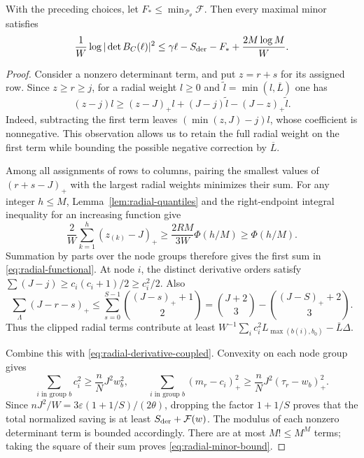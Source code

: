 \begin{proposition}\label{prop:radial-size}
With the preceding choices, let $F_*\leq\min_{\mathcal P_\theta}\mathcal F$.
Then every maximal minor satisfies
\begin{equation}\label{eq:radial-minor-bound}
 \frac1W\log|\det B_C(\ell)|^2
 \leq\gamma\ell-S_{\rm der}-F_*+\frac{2M\log M}{W}.
\end{equation}
\end{proposition}
\begin{proof}
Consider a nonzero determinant term, and put $z=r+s$ for its assigned
row. Since $z\geq r\geq j$, for a radial weight $l\geq0$ and
$\widetilde l=\min(l,\overline L)$ one has
\[
 (z-j)l\geq(z-J)_+l+(J-j)\widetilde l
                               -(J-z)_+\widetilde l.
\]
Indeed, subtracting the first term leaves
$(\min(z,J)-j)l$, whose coefficient is nonnegative.
This observation allows us to retain the full radial weight on the
first term while bounding the possible negative correction by
$\overline L$.

Among all assignments of rows to columns, pairing the smallest values
of $(r+s-J)_+$ with the largest radial weights minimizes their sum.
For any integer $h\leq M$, Lemma~\ref{lem:radial-quantiles} and the
right-endpoint integral inequality for an increasing function give
\[
 \frac2W\sum_{k=1}^h(z_{(k)}-J)_+
 \geq\frac{2RM}{3W}\Phi(h/M)\geq\Phi(h/M).
\]
Summation by parts over the node groups therefore gives the first sum
in \eqref{eq:radial-functional}.
At node $i$, the distinct derivative orders satisfy
$\sum(J-j)\geq c_i(c_i+1)/2\geq c_i^2/2$.
Also
\[
 \sum_{\Lambda}(J-r-s)_+
 \leq\sum_{s=0}^{S-1}\binom{(J-s)_++1}{2}
 =\binom{J+2}{3}-\binom{(J-S)_++2}{3}.
\]
Thus the clipped radial terms contribute at least
$W^{-1}\sum_i c_i^2L_{\max(b(i),b_0)}-\overline L\Delta$.

Combine this with \eqref{eq:radial-derivative-coupled}.
Convexity on each node group gives
\[
 \sum_{i\text{ in group }b}c_i^2\geq\frac nN J^2w_b^2,
 \qquad
 \sum_{i\text{ in group }b}(m_r-c_i)_+^2
       \geq\frac nN J^2(\tau_r-w_b)_+^2.
\]
Since $nJ^2/W=3\varepsilon(1+1/S)/(2\theta)$, dropping the factor
$1+1/S$ proves that the total normalized saving is at least
$S_{\rm der}+\mathcal F(w)$. The modulus of each nonzero determinant
term is bounded accordingly. There are at most $M!\leq M^M$ terms;
taking the square of their sum proves \eqref{eq:radial-minor-bound}.
\end{proof}

